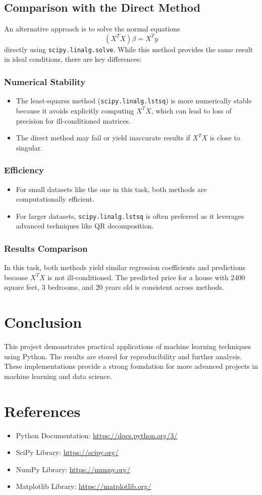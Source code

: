 \documentclass[a4paper,12pt]{article}
\begin{document}
    \subsection{Comparison with the Direct Method}

    An alternative approach is to solve the normal equations 
    \[
    (X^T X) \beta = X^T y
    \]
    directly using \texttt{scipy.linalg.solve}. While this method provides the same result in ideal conditions, there are key differences:
    
    \subsubsection{Numerical Stability}
    \begin{itemize}
        \item The least-squares method (\texttt{scipy.linalg.lstsq}) is more numerically stable because it avoids explicitly computing $X^T X$, which can lead to loss of precision for ill-conditioned matrices.
        \item The direct method may fail or yield inaccurate results if $X^T X$ is close to singular.
    \end{itemize}
    
    \subsubsection{Efficiency}
    \begin{itemize}
        \item For small datasets like the one in this task, both methods are computationally efficient.
        \item For larger datasets, \texttt{scipy.linalg.lstsq} is often preferred as it leverages advanced techniques like QR decomposition.
    \end{itemize}
    
    \subsubsection{Results Comparison}
    In this task, both methods yield similar regression coefficients and predictions because $X^T X$ is not ill-conditioned. The predicted price for a house with 2400 square feet, 3 bedrooms, and 20 years old is consistent across methods.
    
\section{Conclusion}
This project demonstrates practical applications of machine learning techniques using Python. The results are stored for reproducibility and further analysis. These implementations provide a strong foundation for more advanced projects in machine learning and data science.

\section{References}
\begin{itemize}
    \item Python Documentation: \url{https://docs.python.org/3/}
    \item SciPy Library: \url{https://scipy.org/}
    \item NumPy Library: \url{https://numpy.org/}
    \item Matplotlib Library: \url{https://matplotlib.org/}
\end{itemize}
\end{document}
